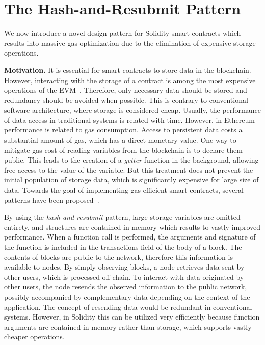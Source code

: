 \section{The Hash-and-Resubmit Pattern}

We now introduce a novel design pattern for Solidity smart contracts which
results into massive gas optimization due to the elimination of expensive
storage operations.

\textbf{Motivation.}
It is essential for smart contracts to store data in the blockchain. However,
interacting with the storage of a contract is among the most expensive
operations of the EVM~\cite{wood, buterin}. Therefore, only necessary data
should be stored and redundancy should be avoided when possible. This is
contrary to conventional software architecture, where storage is considered
cheap. Usually, the performance of data access in traditional systems is
related with time.  However, in Ethereum performance is related to gas
consumption. Access to persistent data costs a substantial amount of gas, which
has a direct monetary value. One way to mitigate gas cost of reading variables
from the blockchain is to declare them public.  This leads to the creation of a
\emph{getter} function in the background, allowing free access to the value of
the variable. But this treatment does not prevent the initial population of
storage data, which is significantly expensive for large size of data.
Towards the goal of implementing gas-efficient smart contracts, several
patterns have been proposed~\cite{contract-opt-1, contract-opt-2,
contract-opt-3}.

By using the \emph{hash-and-resubmit} pattern, large storage variables are
omitted entirety, and structures are contained in memory which results to
vastly improved performance. When a function call is performed, the arguments
and signature of the function is included in the transactions field of the body
of a block. The contents of blocks are public to the network, therefore this
information is available to nodes. By simply observing blocks, a node retrieves
data sent by other users, which is processed off-chain. To interact with data
originated by other users, the node resends the observed information to the
public network, possibly accompanied by complementary data depending on the
context of the application. The concept of resending data would be redundant in
conventional systems. However, in Solidity this can be utilized very
efficiently because function arguments are contained in memory rather than
storage, which supports vastly cheaper operations.

